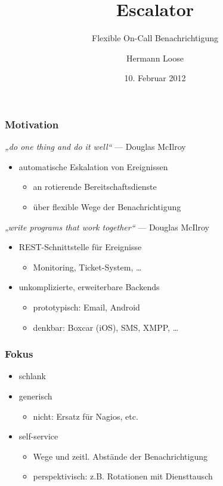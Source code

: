 \documentclass[10pt]{beamer}
\title{Escalator}
\subtitle{Flexible On-Call Benachrichtigung}
\author{Hermann Loose}
\institute[ZIH TUD]{Zentrum für Informationsdienste und Hochleistungsrechnen — TU Dresden}
\date{10. Februar 2012}
\begin{document}
\zihmaketitle

\begin{frame}
  \frametitle{Motivation}
  \begin{flushleft}
    \emph{„do one thing and do it well“} — Douglas McIlroy
  \end{flushleft}
  \begin{itemize}
    \item automatische Eskalation von Ereignissen
    \begin{itemize}
      \item an rotierende Bereitschaftsdienste
      \item über flexible Wege der Benachrichtigung
    \end{itemize}
  \end{itemize}
  \begin{flushleft}
    \emph{„write programs that work together“} — Douglas McIlroy
  \end{flushleft}
  \begin{itemize}
    \item REST-Schnittstelle für Ereignisse
    \begin{itemize}
      \item Monitoring, Ticket-System, …
    \end{itemize}
    \item unkomplizierte, erweiterbare Backends
    \begin{itemize}
      \item prototypisch: Email, Android
      \item denkbar: Boxcar (iOS), SMS, XMPP, …
    \end{itemize}
  \end{itemize}
\end{frame}

\begin{frame}[c]
  \frametitle{Fokus}
  \begin{itemize}
    \item schlank
    \item generisch
    \begin{itemize}
      \item nicht: Ersatz für Nagios, etc.
    \end{itemize}
    \item self-service
    \begin{itemize}
      \item Wege und zeitl. Abstände der Benachrichtigung
      \item perspektivisch: z.B. Rotationen mit Diensttausch
    \end{itemize}
  \end{itemize}
\end{frame}
\end{document}
